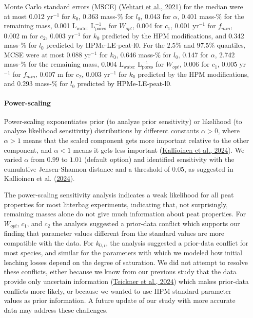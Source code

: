 \documentclass[
  12pt,
]{article}
\begin{document}
Monte Carlo standard errors (MSCE) (\protect\hyperlink{ref-Vehtari.2021}{Vehtari et al., 2021}) for the median were at most 0.012 yr\(^{-1}\) for \(k_0\), 0.363 mass-\% for \(l_0\), 0.043 for \(\alpha\), 0.401 mass-\% for the remaining mass, 0.001 L\(_\text{water}\) L\(_\text{pores}^{-1}\) for \(W_{opt}\), 0.004 for \(c_{1}\), 0.001 yr\(^{-1}\) for \(f_{min}\), 0.002 m for \(c_{2}\), 0.003 yr\(^{-1}\) for \(k_0\) predicted by the HPM modifications, and 0.342 mass-\% for \(l_0\) predicted by HPMe-LE-peat-l0. For the 2.5\% and 97.5\% quantiles, MCSE were at most 0.088 yr\(^{-1}\) for \(k_0\), 0.646 mass-\% for \(l_0\), 0.147 for \(\alpha\), 2.742 mass-\% for the remaining mass, 0.004 L\(_\text{water}\) L\(_\text{pores}^{-1}\) for \(W_{opt}\), 0.006 for \(c_{1}\), 0.005 yr\(^{-1}\) for \(f_{min}\), 0.007 m for \(c_{2}\), 0.003 yr\(^{-1}\) for \(k_0\) predicted by the HPM modifications, and 0.293 mass-\% for \(l_0\) predicted by HPMe-LE-peat-l0.

\hypertarget{power-scaling}{%
\paragraph*{Power-scaling}\label{power-scaling}}

Power-scaling exponentiates prior (to analyze prior sensitivity) or likelihood (to analyze likelihood sensitivity) distributions by different constants \(\alpha>0\), where \(\alpha>1\) means that the scaled component gets more important relative to the other component, and \(\alpha<1\) means it gets less important (\protect\hyperlink{ref-Kallioinen.2024}{Kallioinen et al., 2024}). We varied \(\alpha\) from \(0.99\) to \(1.01\) (default option) and identified sensitivity with the cumulative Jensen-Shannon distance and a threshold of 0.05, as suggested in Kallioinen et al. (\protect\hyperlink{ref-Kallioinen.2024}{2024}).

The power-scaling sensitivity analysis indicates a weak likelihood for all peat properties for most litterbag experiments, indicating that, not surprisingly, remaining masses alone do not give much information about peat properties. For \(W_{opt}\), \(c_{1}\), and \(c_{2}\) the analysis suggested a prior-data conflict which supports our finding that parameter values different from the standard values are more compatible with the data. For \(k_{0,i}\), the analysis suggested a prior-data conflict for most species, and similar for the parameters with which we modeled how initial leaching losses depend on the degree of saturation. We did not attempt to resolve these conflicts, either because we know from our previous study that the data provide only uncertain information (\protect\hyperlink{ref-Teickner.2024f}{Teickner et al., 2024}) which makes prior-data conflicts more likely, or because we wanted to use HPM standard parameter values as prior information. A future update of our study with more accurate data may address these challenges.
\end{document}
